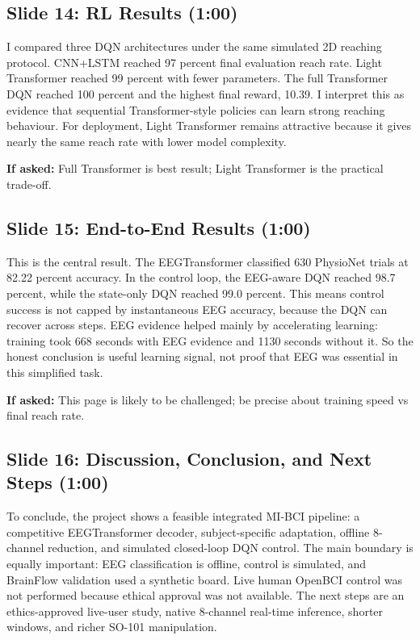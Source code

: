 \documentclass[11pt]{article}
\begin{document}
\subsection*{Slide 14: RL Results (1:00)}
I compared three DQN architectures under the same simulated 2D reaching protocol. CNN+LSTM reached 97 percent final evaluation reach rate. Light Transformer reached 99 percent with fewer parameters. The full Transformer DQN reached 100 percent and the highest final reward, 10.39. I interpret this as evidence that sequential Transformer-style policies can learn strong reaching behaviour. For deployment, Light Transformer remains attractive because it gives nearly the same reach rate with lower model complexity.


\textbf{If asked:} Full Transformer is best result; Light Transformer is the practical trade-off.

\subsection*{Slide 15: End-to-End Results (1:00)}
This is the central result. The EEGTransformer classified 630 PhysioNet trials at 82.22 percent accuracy. In the control loop, the EEG-aware DQN reached 98.7 percent, while the state-only DQN reached 99.0 percent. This means control success is not capped by instantaneous EEG accuracy, because the DQN can recover across steps. EEG evidence helped mainly by accelerating learning: training took 668 seconds with EEG evidence and 1130 seconds without it. So the honest conclusion is useful learning signal, not proof that EEG was essential in this simplified task.


\textbf{If asked:} This page is likely to be challenged; be precise about training speed vs final reach rate.

\subsection*{Slide 16: Discussion, Conclusion, and Next Steps (1:00)}
To conclude, the project shows a feasible integrated MI-BCI pipeline: a competitive EEGTransformer decoder, subject-specific adaptation, offline 8-channel reduction, and simulated closed-loop DQN control. The main boundary is equally important: EEG classification is offline, control is simulated, and BrainFlow validation used a synthetic board. Live human OpenBCI control was not performed because ethical approval was not available. The next steps are an ethics-approved live-user study, native 8-channel real-time inference, shorter windows, and richer SO-101 manipulation.
\end{document}
